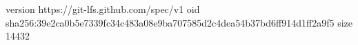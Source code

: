 version https://git-lfs.github.com/spec/v1
oid sha256:39e2ca0b5e7339fc34c483a08e9ba707585d2c4dea54b37bd6ff914d1ff2a9f5
size 14432
